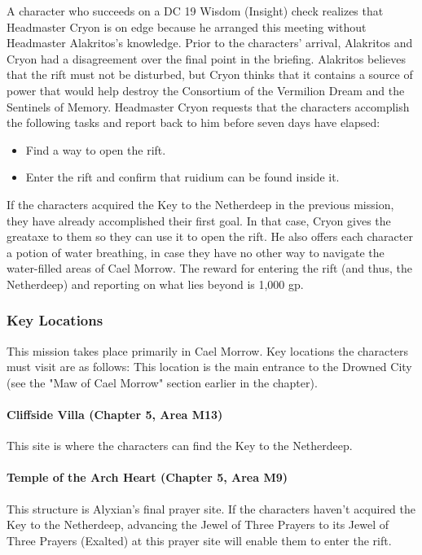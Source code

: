 \documentclass[10pt,a4,twoside,twocolumn,openany,nodeprecatedcode]{dndbook}
\begin{document}
A character who succeeds on a DC 19 Wisdom (Insight) check realizes that Headmaster Cryon is on edge because he arranged this meeting without Headmaster Alakritos's knowledge. Prior to the characters' arrival, Alakritos and Cryon had a disagreement over the final point in the briefing. Alakritos believes that the rift must not be disturbed, but Cryon thinks that it contains a source of power that would help destroy the Consortium of the Vermilion Dream and the Sentinels of Memory.
Headmaster Cryon requests that the characters accomplish the following tasks and report back to him before seven days have elapsed:
\begin{itemize}

\item Find a way to open the rift.
\item Enter the rift and confirm that ruidium can be found inside it.
\end{itemize}


If the characters acquired the Key to the Netherdeep in the previous mission, they have already accomplished their first goal. In that case, Cryon gives the greataxe to them so they can use it to open the rift. He also offers each character a potion of water breathing, in case they have no other way to navigate the water-filled areas of Cael Morrow.
The reward for entering the rift (and thus, the Netherdeep) and reporting on what lies beyond is 1,000 gp.
\subsubsection{Key Locations}
This mission takes place primarily in Cael Morrow. Key locations the characters must visit are as follows:
{{This location is the main entrance to the Drowned City (see the "Maw of Cael Morrow" section earlier in the chapter).}}
\paragraph{Cliffside Villa (Chapter 5, Area M13)}
This site is where the characters can find the Key to the Netherdeep.
\paragraph{Temple of the Arch Heart (Chapter 5, Area M9)}
This structure is Alyxian's final prayer site. If the characters haven't acquired the Key to the Netherdeep, advancing the Jewel of Three Prayers to its Jewel of Three Prayers (Exalted) at this prayer site will enable them to enter the rift.
\end{document}
